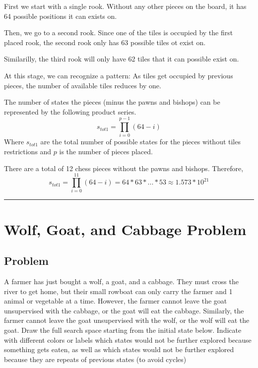 \documentclass[11pt]{article}
\begin{document}
\begin{flushleft}
First we start with a single rook. Without any other pieces on the board, it has
64 possible positions it can exists on.

Then, we go to a second rook. Since one of the tiles is occupied by the first
placed rook, the second rook only has 63 possible tiles ot exist on.

Similarilly, the third rook will only have 62 tiles that it can possible exist
on.

At this stage, we can recognize a pattern: As tiles get occupied by previous
    pieces, the number of available tiles reduces by one.

The number of states the pieces (minus the pawns and bishops) can be represented
by the following product series.
\begin{equation}
    s_{tot1} = \prod_{i = 0}^{p - 1} (64 - i)
\end{equation}
Where $s_{tot1}$ are the total number of possible states for the pieces without
tiles restrictions and $p$ is the number of pieces placed.

There are a total of 12 chess pieces without the pawns and bishops.
Therefore,
\begin{equation}
    s_{tot1} = \prod_{i = 0}^{11} (64 - i) = 64 * 63 * ... * 53 \approx 1.573 *
    10^{21}
\end{equation}


\hspace{1cm}
\hrule
\section*{Wolf, Goat, and Cabbage Problem}

\subsection*{Problem}
A farmer has just bought a wolf, a goat, and a cabbage. They must cross the
river to get home, but their small rowboat can only carry the farmer and 1
animal or vegetable at a time. However, the farmer cannot leave the goat
unsupervised with the cabbage, or the goat will eat the cabbage. Similarly,
the farmer cannot leave the goat unsupervised with the wolf, or the wolf
will eat the goat. Draw the full search space starting from the initial
state below. Indicate with different colors or labels which states would
not be further explored because something gets eaten, as well as which
states would not be further explored because they are repeats of previous
states (to avoid cycles)


\end{flushleft}
\end{document}
